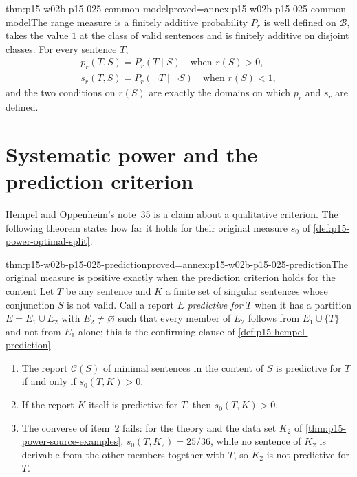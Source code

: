 \begin{hbtheorem}{thm:p15-w02b-p15-025-common-model}{proved=annex:p15-w02b-p15-025-common-model}{The range measure is a finitely additive probability}
\(P_r\) is well defined on \(\mathcal B\), takes the value \(1\) at the
class of valid sentences and is finitely additive on disjoint classes.
For every sentence \(T\),
\[
 \begin{gathered}
 p_r(T,S)=P_r(T\mid S)\quad\text{when }r(S)>0,\\
 s_r(T,S)=P_r(\neg T\mid\neg S)\quad\text{when }r(S)<1,
 \end{gathered}
\]
and the two conditions on \(r(S)\) are exactly the domains on which
\(p_r\) and \(s_r\) are defined.
\end{hbtheorem}

\section{Systematic power and the prediction criterion}
\label{sec:p15-w02b-p15-025-prediction}

Hempel and Oppenheim's note~35 is a claim about a qualitative criterion.
The following theorem states how far it holds for their original measure
\(s_0\) of \cref{def:p15-power-optimal-split}.

\begin{hbtheorem}{thm:p15-w02b-p15-025-prediction}{proved=annex:p15-w02b-p15-025-prediction}{The original measure is positive exactly when the prediction criterion holds for the content}
Let \(T\) be any sentence and \(K\) a finite set of singular sentences
whose conjunction \(S\) is not valid. Call a report \(E\) \emph{predictive
for} \(T\) when it has a partition \(E=E_1\mathbin{\dot\cup}E_2\) with
\(E_2\neq\varnothing\) such that every member of \(E_2\) follows from
\(E_1\cup\{T\}\) and not from \(E_1\) alone; this is the confirming clause
of \cref{def:p15-hempel-prediction}.
\begin{enumerate}
\item The report \(\mathcal C(S)\) of minimal sentences in the content of
\(S\) is predictive for \(T\) if and only if \(s_0(T,K)>0\).
\item If the report \(K\) itself is predictive for \(T\), then
\(s_0(T,K)>0\).
\item The converse of item~2 fails: for the theory and the data set
\(K_2\) of \cref{thm:p15-power-source-examples}, \(s_0(T,K_2)=25/36\),
while no sentence of \(K_2\) is derivable from the other members together
with \(T\), so \(K_2\) is not predictive for \(T\).
\end{enumerate}
\end{hbtheorem}

